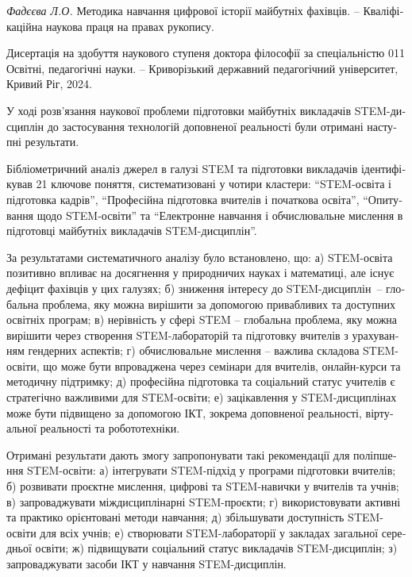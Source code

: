 {\begin{otherlanguage}{ukrainian}
\textit{Фадєєва Л.О.} Методика навчання цифрової історії майбутніх фахівців. -- Кваліфікаційна наукова праця на правах рукопису.

Дисертація на здобуття наукового ступеня доктора філософії за спеціальністю 011 Освітні, педагогічні науки. -- Криворізький державний педагогічний університет, Кривий Ріг, 2024.

{У ході розв'язання наукової проблеми підготовки майбутніх викладачів \linebreak STEM-дисциплін до застосування технологій доповненої реальності були  отримані наступні результати.

Бібліометричний аналіз джерел в галузі STEM та підготовки викладачів ідентифікував 21 ключове поняття, систематизовані у чотири кластери: ``STEM-освіта і підготовка кадрів'', ``Професійна підготовка вчителів і початкова освіта'', ``Опитування щодо STEM-освіти'' та ``Електронне навчання і обчислювальне мислення в підготовці майбутніх викладачів STEM-дисциплін''.

За результатами систематичного аналізу було встановлено, що: а) 
    STEM-освіта позитивно впливає на досягнення у природничих науках і математиці, але існує дефіцит фахівців у цих галузях;
б)    зниження інтересу до STEM-дисциплін~-- глобальна проблема, яку можна вирішити за допомогою привабливих та доступних освітніх програм;
    в) нерівність у сфері STEM -- глобальна проблема, яку можна вирішити через створення STEM-лабораторій та підготовку вчителів з урахуванням гендерних аспектів;
    г) обчислювальне мислення -- важлива складова STEM-освіти, що може бути впроваджена через семінари для вчителів, онлайн-курси та методичну підтримку;
    д) професійна підготовка та соціальний статус учителів є стратегічно важливими для STEM-освіти;
    е) зацікавлення у STEM-дис\-цип\-лі\-нах може бути підвищено за допомогою ІКТ, зокрема доповненої реальності, віртуальної реальності та робототехніки.

Отримані результати дають змогу запропонувати такі рекомендації для поліпшення STEM-освіти:
а) інтегрувати STEM-підхід у програми підготовки вчителів;
б) розвивати проєктне мислення, цифрові та STEM-навички у вчителів та учнів;
в) запроваджувати міждисциплінарні STEM-проєкти;
г) використовувати активні та практико орієнтовані методи навчання;
д) збільшувати доступність STEM-освіти для всіх учнів;
е) створювати STEM-лабораторії у закладах загальної середньої освіти;
ж) підвищувати соціальний статус викладачів STEM-дисциплін;
з) запроваджувати засоби ІКТ у навчання STEM-дисциплін.

}
\end{otherlanguage}}
